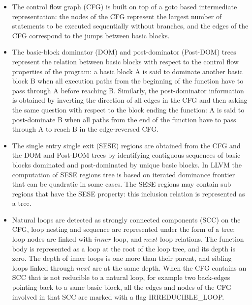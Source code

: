 \documentclass{sig-alternate}
\begin{document}
\begin{itemize}
\item The control flow graph (CFG) \cite{dragonbook} is built on top of a goto
  based intermediate representation: the nodes of the CFG represent the largest
  number of statements to be executed sequentially without branches, and the
  edges of the CFG correspond to the jumps between basic blocks.

\item The basic-block dominator (DOM) and post-dominator (Post-DOM) trees
  \cite{dragonbook, ramalingam} represent the relation between basic blocks with
  respect to the control flow properties of the program: a basic block A is said
  to dominate another basic block B when all execution paths from the beginning
  of the function have to pass through A before reaching B.  Similarly, the
  post-dominator information is obtained by inverting the direction of all edges
  in the CFG and then asking the same question with respect to the block ending
  the function: A is said to post-dominate B when all paths from the end of the
  function have to pass through A to reach B in the edge-reversed CFG.

\item The single entry single exit (SESE) regions \cite{sese} are obtained from
  the CFG and the DOM and Post-DOM trees by identifying contiguous sequences of
  basic blocks dominated and post-dominated by unique basic blocks.  In LLVM the
  computation of SESE regions tree is based on iterated dominance frontier
  \cite{ramalingam} that can be quadratic in some cases.  The SESE
  regions may contain sub regions that have the SESE property: this inclusion
  relation is represented as a tree.

\label{subsec:loop-tree}
\item Natural loops \cite{dragonbook, ramalingam} are detected as strongly connected
  components (SCC) \cite{tarjan} on the CFG, loop nesting and sequence are
  represented under the form of a tree: loop nodes are linked with $inner$ loop,
  and $next$ loop relations.  The function body is represented as a loop at the
  root of the loop tree, and its depth is zero.  The depth of inner loops is one
  more than their parent, and sibling loops linked through $next$ are at the
  same depth.  When the CFG contains an SCC that is not reducible to a natural
  loop, for example two back-edges pointing back to a same basic block, all the
  edges and nodes of the CFG involved in that SCC are marked with a flag
  IRREDUCIBLE\_LOOP.


\end{itemize}
\end{document}
